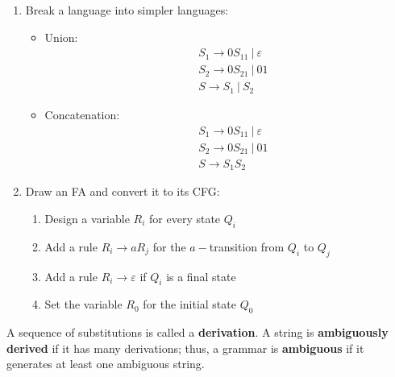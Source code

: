 \documentclass{article}
\begin{document}
\begin{enumerate}
    \item Break a language into simpler languages:
        \begin{itemize}
            \item Union: 
                \begin{align*}
                    &S_1 \rightarrow 0S_11 \ | \ \varepsilon \\
                    &S_2 \rightarrow 0S_21 \ | \ 01 \\ 
                    &S \rightarrow S_1 \ | \ S_2
                \end{align*}
            \item Concatenation:
                \begin{align*}
                    &S_1 \rightarrow 0S_11 \ | \ \varepsilon \\
                    &S_2 \rightarrow 0S_21 \ | \ 01 \\ 
                    &S \rightarrow S_1S_2
                \end{align*}
        \end{itemize}
    \item Draw an FA and convert it to its CFG:
        \begin{enumerate}
            \item Design a variable $R_i$ for every state $Q_i$
            \item Add a rule $R_i \rightarrow aR_j$ for the $a-$transition from $Q_i$ to $Q_j$
            \item Add a rule $R_i \rightarrow \varepsilon$ if $Q_i$ is a final state
            \item Set the variable $R_0$ for the initial state $Q_0$ 
        \end{enumerate}
\end{enumerate}
A sequence of substitutions is called a \textbf{derivation}. A string is \textbf{ambiguously derived} if it has many derivations; thus, a grammar is \textbf{ambiguous} if it generates at least one ambiguous string.
\newpage
\end{document}
